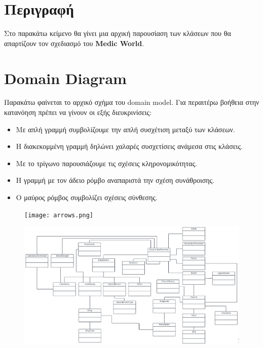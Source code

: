 \documentclass{article}
\begin{document}
\section{Περιγραφή}
Στο παρακάτω κείμενο θα γίνει μια αρχική παρουσίαση των κλάσεων που θα απαρτίζουν τον σχεδιασμό του \textbf{Medic World}. 

\vspace{1cm}

\section{Domain Diagram}
Παρακάτω φαίνεται το αρχικό σχήμα του domain model. Για περαιτέρω βοήθεια στην κατανόηση πρέπει
να γίνουν οι εξής διευκρινίσεις:

\begin{itemize}
    \item Με απλή γραμμή συμβολίζουμε την απλή συσχέτιση μεταξύ των κλάσεων.
    \item Η διακεκομμένη γραμμή δηλώνει χαλαρές συσχετίσεις ανάμεσα στις κλάσεις.
    \item Με το τρίγωνο παρουσιάζουμε τις σχέσεις κληρονομικότητας.
    \item Η γραμμή με τον άδειο ρόμβο αναπαριστά την σχέση συνάθροισης.
    \item Ο μαύρος ρόμβος συμβολίζει σχέσεις σύνθεσης.
\end{itemize}


\begin{figure}[!htb]
        \centering
        \texttt{[image: arrows.png]}
        \end{figure}


\begin{figure}[!htb]
        \centering
        \includegraphics[width=1.0\textwidth]{domain.png}
        \end{figure}
\end{document}
